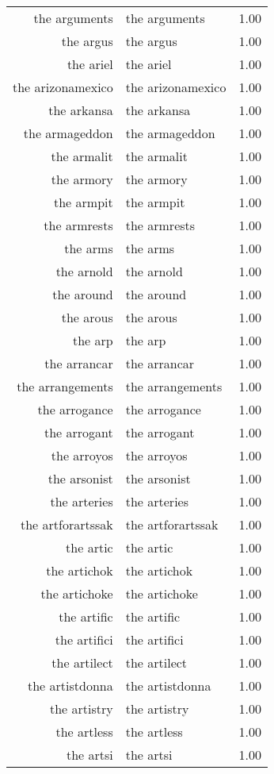 \begin{table}[ht]
\begin{tabular}{rlr}
  the arguments & the arguments & 1.00 \\ 
  the argus & the argus & 1.00 \\ 
  the ariel & the ariel & 1.00 \\ 
  the arizonamexico & the arizonamexico & 1.00 \\ 
  the arkansa & the arkansa & 1.00 \\ 
  the armageddon & the armageddon & 1.00 \\ 
  the armalit & the armalit & 1.00 \\ 
  the armory & the armory & 1.00 \\ 
  the armpit & the armpit & 1.00 \\ 
  the armrests & the armrests & 1.00 \\ 
  the arms & the arms & 1.00 \\ 
  the arnold & the arnold & 1.00 \\ 
  the around & the around & 1.00 \\ 
  the arous & the arous & 1.00 \\ 
  the arp & the arp & 1.00 \\ 
  the arrancar & the arrancar & 1.00 \\ 
  the arrangements & the arrangements & 1.00 \\ 
  the arrogance & the arrogance & 1.00 \\ 
  the arrogant & the arrogant & 1.00 \\ 
  the arroyos & the arroyos & 1.00 \\ 
  the arsonist & the arsonist & 1.00 \\ 
  the arteries & the arteries & 1.00 \\ 
  the artforartssak & the artforartssak & 1.00 \\ 
  the artic & the artic & 1.00 \\ 
  the artichok & the artichok & 1.00 \\ 
  the artichoke & the artichoke & 1.00 \\ 
  the artific & the artific & 1.00 \\ 
  the artifici & the artifici & 1.00 \\ 
  the artilect & the artilect & 1.00 \\ 
  the artistdonna & the artistdonna & 1.00 \\ 
  the artistry & the artistry & 1.00 \\ 
  the artless & the artless & 1.00 \\ 
  the artsi & the artsi & 1.00 \\ 

\end{tabular}
\end{table}
